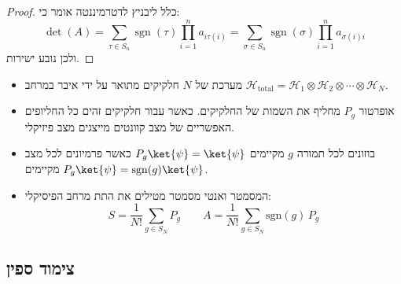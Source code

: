 \documentclass{tstextbook}
\begin{document}
\begin{proof}
כלל ליבניץ לדטרמיננטה אומר כי:
$$\operatorname*{det}(A)=\sum_{\tau\in S_{n}}\operatorname{sgn}(\tau)\prod_{i=1}^{n}a_{i\tau(i)}=\sum_{\sigma\in S_{n}}\operatorname{sgn}(\sigma)\prod_{i=1}^{n}a_{\sigma(i)i}$$
ולכן נובע ישירות.

\end{proof}
\begin{summary}
  \begin{itemize}
    \item מערכת של \(N\) חלקיקים מתואר על ידי איבר במרחב \({\mathcal{H}}_{\mathrm{total}}={\mathcal{H}}_{1}\otimes{\mathcal{H}}_{2}\otimes\cdots\otimes{\mathcal{H}}_{N}\).
    \item אופרטור \(P_{g}\) מחליף את השמות של החלקיקים. כאשר עבור חלקיקים זהים כל החליופים האפשריים של מצב קוונטים מייצגים מצב פיזיקלי.
    \item בוזונים לכל תמורה \(g\) מקיימים \(P_{g}\ket{\psi}=\ket{\psi}\) כאשר פרמיונים לכל מצב מקיימים \(P_{g}\ket{\psi}=\mathrm{sgn}(g)\ket{\psi}\).
    \item המסמטר ואנטי מסמטר מטילים את התת מרחב הפיסיקלי:
$$S={\frac{1}{N!}}\sum_{g\in S_{N}}P_{g}\qquad A=\frac{1}{N!}\sum_{g\in S_{N}}\mathrm{sgn}(g)\,P_{g}$$
  \end{itemize}
\end{summary}
\subsection{צימוד ספין}
\end{document}
